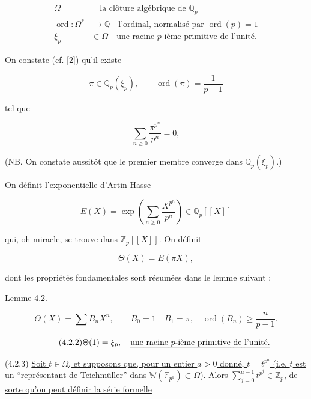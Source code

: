 \begin{align}
\tag{4.1.1}
\Omega&\quad\text{la clôture algébrique de }\mathbb Q_p\\
\tag{4.1.2}
\operatorname{ord}:\Omega^*&\longrightarrow\mathbb Q
\quad\text{l'ordinal, normalisé par }\operatorname{ord}(p)=1\\
\tag{4.1.3}
\xi_p&\in\Omega
\quad\text{une racine $p$-ième primitive de l'unité.}
\end{align}

On constate (cf. [2]) qu'il existe

\begin{equation}\tag{4.1.4}
\pi\in\mathbb Q_p(\xi_p),\qquad
\operatorname{ord}(\pi)=\frac1{p-1}
\end{equation}

tel que

\begin{equation}\tag{4.1.5}
\sum_{n\geq0}\frac{\pi^{p^n}}{p^n}=0,
\end{equation}

(NB. On constate aussitôt que le premier membre converge dans
$\mathbb Q_p(\xi_p)$.)

On définit \underline{l'exponentielle d'Artin-Hasse}

\begin{equation}\tag{4.1.6}
E(X)=\exp\!\left(\sum_{n\geq0}\frac{X^{p^n}}{p^n}\right)
\in\mathbb Q_p[[X]]
\end{equation}

qui, oh miracle, se trouve dans $\mathbb Z_p[[X]]$. On définit

\begin{equation}\tag{4.1.7}
\Theta(X)=E(\pi X),
\end{equation}

dont les propriétés fondamentales sont résumées dans le lemme suivant :

\underline{Lemme} 4.2.

\begin{equation}\tag{4.2.1}
\Theta(X)=\sum B_nX^n,\qquad B_0=1\quad B_1=\pi,\quad
\operatorname{ord}(B_n)\geq\frac n{p-1}.
\end{equation}

\begin{equation}\tag{4.2.2}
\Theta(1)=\xi_p,\quad
\text{\uline{une racine $p$-ième primitive de l'unité.}}
\end{equation}

(4.2.3) \underline{Soit $t\in\Omega$, et supposons que, pour un entier
$a>0$ donné, $t=t^{p^a}$ (i.e. $t$ est un ``représentant de Teichmüller''
dans $\mathbb W(\mathbb F_{p^a})\subset\Omega$). Alors
$\sum_{j=0}^{a-1}t^{p^j}\in\mathbb Z_p$, de sorte qu'on peut définir la
série formelle}

